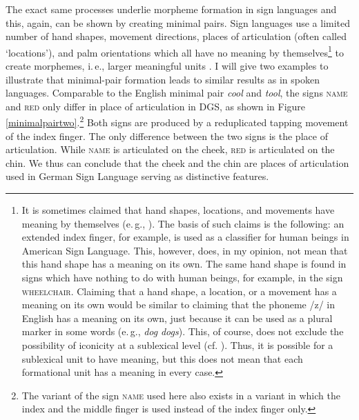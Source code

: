 The exact same processes underlie morpheme formation in sign languages and this, again, can be shown by creating minimal pairs. Sign languages use a limited number of hand shapes, movement directions, places of articulation (often called `locations'), and palm orientations which all have no meaning by themselves\footnote{ It is sometimes claimed that hand shapes, locations, and movements have meaning by themselves (e.\,g., \citealt[943]{sandler2009sign}). The basis of such claims is the following: an extended index finger, for example, is used as a classifier for human beings in American Sign Language. This, however, does, in my opinion, not mean that this hand shape has a meaning on its own. The same hand shape is found in signs which have nothing to do with human beings, for example, in the sign \textsc{wheelchair}. Claiming that a hand shape, a location, or a movement has a meaning on its own would be similar to claiming that the phoneme /z/ in English has a meaning on its own, just because it can be used as a plural marker in some words (e.\,g., \textit{dog}  \textit{dogs}). This, of course, does not exclude the possibility of iconicity at a sublexical level (cf. \citealt{kooij2002phonological,zwitserlood2008morphologybelow}). Thus, it is possible for a sublexical unit to have meaning, but this does not mean that each formational unit has a meaning in every case.} to create morphemes, i.\,e., larger meaningful units \citep{stokoe1960sign, battison1978}. I will give two examples to illustrate that minimal-pair formation leads to similar results as in spoken languages. Comparable to the English minimal pair \textit{cool} and \textit{tool}, the signs \textsc{name} and \textsc{red} only differ in place of articulation in DGS, as shown in Figure \ref{minimalpairtwo}.\footnote{ The variant of the sign \textsc{name} used here also exists in a variant in which the index and the middle finger is used instead of the index finger only.} Both signs are produced by a reduplicated tapping movement of the index finger. The only difference between the two signs is the place of articulation. While \textsc{name} is articulated on the cheek, \textsc{red} is articulated on the chin. We thus can conclude that the cheek and the chin are places of articulation used in German Sign Language serving as distinctive features. 

